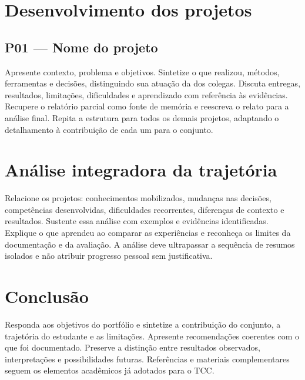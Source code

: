 \chapter{Desenvolvimento dos projetos}
\section{P01 --- Nome do projeto}
Apresente contexto, problema e objetivos. Sintetize o que realizou, métodos,
ferramentas e decisões, distinguindo sua atuação da dos colegas. Discuta
entregas, resultados, limitações, dificuldades e aprendizado com referência
às evidências. Recupere o relatório parcial como fonte de memória e reescreva
o relato para a análise final. Repita a estrutura para todos os demais projetos,
adaptando o detalhamento à contribuição de cada um para o conjunto.

\chapter{Análise integradora da trajetória}
Relacione os projetos: conhecimentos mobilizados, mudanças nas decisões,
competências desenvolvidas, dificuldades recorrentes, diferenças de contexto
e resultados. Sustente essa análise com exemplos e evidências identificadas.
Explique o que aprendeu ao comparar as experiências e reconheça os limites
da documentação e da avaliação. A análise deve ultrapassar a sequência de
resumos isolados e não atribuir progresso pessoal sem justificativa.

\chapter{Conclusão}
Responda aos objetivos do portfólio e sintetize a contribuição do conjunto,
a trajetória do estudante e as limitações. Apresente recomendações coerentes
com o que foi documentado. Preserve a distinção entre resultados observados,
interpretações e possibilidades futuras. Referências e materiais complementares
seguem os elementos acadêmicos já adotados para o TCC.
